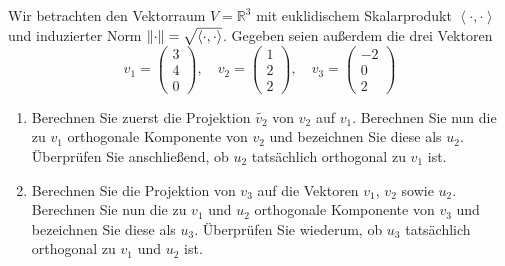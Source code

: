 \documentclass[german,12pt]{homework}
\newcommand{\RR}{\mathbb{R}}
\newcommand{\dotproduct}[2]{\left\langle#1, #2\right\rangle}
\DeclarePairedDelimiter{\norm}{\lVert}{\rVert}
\begin{document}
    \begin{problem}
        Wir betrachten den Vektorraum \(V = \RR^3\) mit euklidischem Skalarprodukt \(\dotproduct{\cdot}{\cdot}\) und induzierter Norm \(\norm*{\cdot} = \sqrt{\dotproduct{\cdot}{\cdot}}\). Gegeben seien außerdem die drei Vektoren
        \[v_1 = \begin{pmatrix}3\\4\\0\end{pmatrix}, \quad v_2 = \begin{pmatrix}1\\2\\2\end{pmatrix}, \quad v_3 = \begin{pmatrix}-2\\0\\2\end{pmatrix}\]
        \begin{enumerate}
            \item Berechnen Sie zuerst die Projektion \(\tilde{v_2}\) von \(v_2\) auf \(v_1\). Berechnen Sie nun die zu \(v_1\) orthogonale Komponente von \(v_2\) und bezeichnen Sie diese als \(u_2\). Überprüfen Sie anschließend, ob \(u_2\) tatsächlich orthogonal zu \(v_1\) ist.
            \item Berechnen Sie die Projektion von \(v_3\) auf die Vektoren \(v_1\), \(v_2\) sowie \(u_2\). Berechnen Sie nun die zu \(v_1\) und \(u_2\) orthogonale Komponente von \(v_3\) und bezeichnen Sie diese als \(u_3\). Überprüfen Sie wiederum, ob \(u_3\) tatsächlich orthogonal zu \(v_1\) und \(u_2\) ist.
        \end{enumerate}
    \end{problem}
\end{document}

